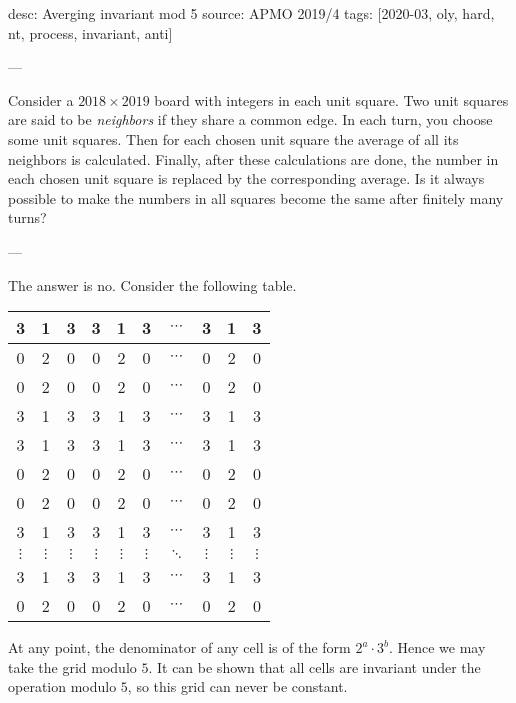 desc: Averging invariant mod 5
source: APMO 2019/4
tags: [2020-03, oly, hard, nt, process, invariant, anti]

---

Consider a $2018\times2019$ board with integers in each unit square. Two unit squares are said to be \emph{neighbors} if they share a common edge. In each turn, you choose some unit squares. Then for each chosen unit square the average of all its neighbors is calculated. Finally, after these calculations are done, the number in each chosen unit square is replaced by the corresponding average. Is it always possible to make the numbers in all squares become the same after finitely many turns?

---

The answer is no. Consider the following table.
\begin{center}
    \begin{tabular}{||c|c|c||c|c|c||c||c|c|c||}
        \hline\hline
        3 & 1 & 3 & 3 & 1 & 3 & $\cdots$ & 3 & 1 & 3\\ \hline
        0 & 2 & 0 & 0 & 2 & 0 & $\cdots$ & 0 & 2 & 0\\ \hline\hline
        0 & 2 & 0 & 0 & 2 & 0 & $\cdots$ & 0 & 2 & 0\\ \hline
        3 & 1 & 3 & 3 & 1 & 3 & $\cdots$ & 3 & 1 & 3\\ \hline\hline
        3 & 1 & 3 & 3 & 1 & 3 & $\cdots$ & 3 & 1 & 3\\ \hline
        0 & 2 & 0 & 0 & 2 & 0 & $\cdots$ & 0 & 2 & 0\\ \hline\hline
        0 & 2 & 0 & 0 & 2 & 0 & $\cdots$ & 0 & 2 & 0\\ \hline
        3 & 1 & 3 & 3 & 1 & 3 & $\cdots$ & 3 & 1 & 3\\ \hline\hline
        $\vdots$ & $\vdots$ & $\vdots$ & $\vdots$ & $\vdots$ & $\vdots$ & $\ddots$ & $\vdots$ & $\vdots$ & $\vdots$ \\ \hline
        3 & 1 & 3 & 3 & 1 & 3 & $\cdots$ & 3 & 1 & 3\\ \hline
        0 & 2 & 0 & 0 & 2 & 0 & $\cdots$ & 0 & 2 & 0\\ \hline\hline
    \end{tabular}
\end{center}
At any point, the denominator of any cell is of the form $2^a\cdot3^b$. Hence we may take the grid modulo $5$. It can be shown that all cells are invariant under the operation modulo $5$, so this grid can never be constant.
